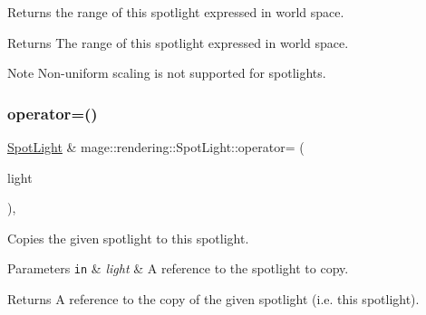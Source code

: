 Returns the range of this spotlight expressed in world space.

\begin{DoxyReturn}{Returns}
The range of this spotlight expressed in world space. 
\end{DoxyReturn}
\begin{DoxyNote}{Note}
Non-\/uniform scaling is not supported for spotlights. 
\end{DoxyNote}
\hypertarget{classmage_1_1rendering_1_1_spot_light_a6bf91b086aa54f2e31d92ed401cf0fdc}{}\label{classmage_1_1rendering_1_1_spot_light_a6bf91b086aa54f2e31d92ed401cf0fdc} 
\subsubsection{\texorpdfstring{operator=()}{operator=()}\hspace{0.1cm}{\footnotesize\ttfamily [1/2]}}
{\footnotesize\ttfamily \hyperlink{classmage_1_1rendering_1_1_spot_light}{Spot\+Light} \& mage\+::rendering\+::\+Spot\+Light\+::operator= (\begin{DoxyParamCaption}\item[{const \hyperlink{classmage_1_1rendering_1_1_spot_light}{Spot\+Light} \&}]{light }\end{DoxyParamCaption})\hspace{0.3cm}{\ttfamily [default]}, {\ttfamily [noexcept]}}

Copies the given spotlight to this spotlight.


\begin{DoxyParams}[1]{Parameters}
\mbox{\tt in}  & {\em light} & A reference to the spotlight to copy. \\
\hline
\end{DoxyParams}
\begin{DoxyReturn}{Returns}
A reference to the copy of the given spotlight (i.\+e. this spotlight). 
\end{DoxyReturn}
\hypertarget{classmage_1_1rendering_1_1_spot_light_a58ff20b0459ccd6df54c85a361faa5ad}{}\label{classmage_1_1rendering_1_1_spot_light_a58ff20b0459ccd6df54c85a361faa5ad} 
